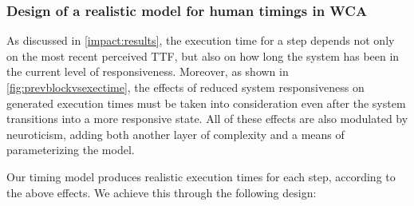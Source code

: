 \subsubsection{Design of a realistic model for human timings in \gls{WCA}}


As discussed in \cref{impact:results}, the execution time for a step depends not only on the most recent perceived \gls{TTF}, but also on how long the system has been in the current level of responsiveness.
Moreover, as shown in \cref{fig:prevblockvsexectime}, the effects of reduced system responsiveness on generated execution times must be taken into consideration even after the system transitions into a more responsive state.
All of these effects are also modulated by neuroticism, adding both another layer of complexity and a means of parameterizing the model.

Our timing model produces realistic execution times for each step, according to the above effects.
We achieve this through the following design:

